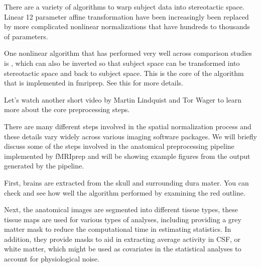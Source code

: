 \documentclass[letterpaper,10pt,english]{sphinxmanual}
\begin{document}
There are a variety of algorithms to warp subject data into stereotactic space. Linear 12 parameter affine transformation have been increasingly been replaced by more complicated nonlinear normalizations that have hundreds to thousands of parameters.

One nonlinear algorithm that has performed very well across comparison studies is , which can also be inverted so that subject space can be transformed into stereotactic space and back to subject space. This is the core of the  algorithm that is implemented in fmriprep. See this  for more details.

Let’s watch another short video by Martin Lindquist and Tor Wager to learn more about the core preprocessing steps.

\begin{sphinxVerbatim}[commandchars=\\\{\}]
\end{sphinxVerbatim}

\noindent{}

There are many different steps involved in the spatial normalization process and these details vary widely across various imaging software packages. We will briefly discuss some of the steps involved in the anatomical preprocessing pipeline implemented by fMRIprep and will be showing example figures from the output generated by the pipeline.

First, brains are extracted from the skull and surrounding dura mater. You can check and see how well the algorithm performed by examining the red outline.


Next, the anatomical images are segmented into different tissue types, these tissue maps are used for various types of analyses, including providing a grey matter mask to reduce the computational time in estimating statistics. In addition, they provide masks to aid in extracting average activity in CSF, or white matter, which might be used as covariates in the statistical analyses to account for physiological noise.
\end{document}
